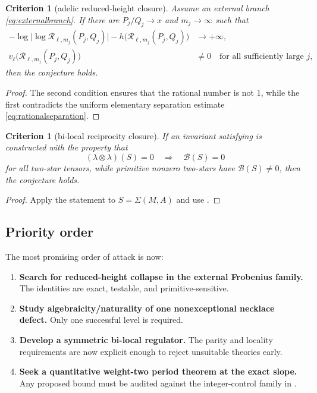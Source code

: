 \documentclass[11pt]{article}
\numberwithin{equation}{section}
\newtheorem{criterion}[theorem]{Criterion}
\theoremstyle{definition}
\theoremstyle{remark}
\begin{document}
\begin{criterion}[adelic reduced-height closure]\label{crit:adelic}
Assume an external branch \eqref{eq:externalbranch}.  If there are $P_j/Q_j\to x$ and $m_j\to\infty$ such that
\begin{align}
  -\log\bigl|\log\mathscr R_{\ell,m_j}(P_j,Q_j)\bigr|
  -h\bigl(\mathscr R_{\ell,m_j}(P_j,Q_j)\bigr)
  &\longrightarrow+\infty,\label{eq:adeliccontradiction}\\
  v_\ell\bigl(\mathscr R_{\ell,m_j}(P_j,Q_j)\bigr)&\ne0
  \quad\text{for all sufficiently large $j$},
\end{align}
then the conjecture holds.
\end{criterion}

\begin{proof}
The second condition ensures that the rational number is not $1$, while the first contradicts the uniform elementary separation estimate \eqref{eq:rationalseparation}.
\end{proof}

\begin{criterion}[bi-local reciprocity closure]\label{crit:bilocalclosure}
If an invariant satisfying  is constructed with the property that
\[
  (\lambda\otimes\lambda)(S)=0
  \quad\Longrightarrow\quad
  \mathscr B(S)=0
\]
for all two-star tensors, while primitive nonzero two-stars have $\mathscr B(S)\ne0$, then the conjecture holds.
\end{criterion}

\begin{proof}
Apply the statement to $S=\Sigma(M,A)$ and use .
\end{proof}

\subsection{Priority order}

The most promising order of attack is now:
\begin{enumerate}[label=\textbf{P\arabic*.}]
  \item \textbf{Search for reduced-height collapse in the external Frobenius family.}  The identities are exact, testable, and primitive-sensitive.
  \item \textbf{Study algebraicity/naturality of one nonexceptional necklace defect.}  Only one successful level is required.
  \item \textbf{Develop a symmetric bi-local regulator.}  The parity and locality requirements are now explicit enough to reject unsuitable theories early.
  \item \textbf{Seek a quantitative weight-two period theorem at the exact slope.}  Any proposed bound must be audited against the integer-control family in .
\end{enumerate}
\end{document}
